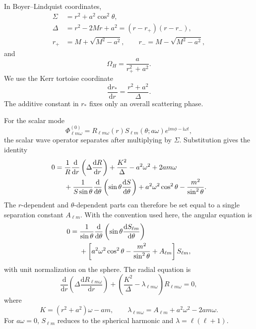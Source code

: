 \documentclass[aps,prd,twocolumn,nofootinbib,superscriptaddress,10pt,floatfix]{revtex4-2}
\newcommand{\ii}{\mathrm{i}}
\newcommand{\dd}{\mathrm{d}}
\newcommand{\rp}{r_+}
\newcommand{\rmn}{r_-}
\newcommand{\OmH}{\Omega_H}
\begin{document}
In Boyer--Lindquist coordinates,
\begin{align}
\Sigma &= r^2+a^2\cos^2\theta,\\
\Delta &= r^2-2Mr+a^2=(r-\rp)(r-\rmn),\\
\rp &= M+\sqrt{M^2-a^2},\qquad
\rmn = M-\sqrt{M^2-a^2},
\end{align}
and
\begin{equation}
\OmH=\frac{a}{\rp^2+a^2}.
\end{equation}
We use the Kerr tortoise coordinate
\begin{equation}
\frac{\dd r_*}{\dd r}=\frac{r^2+a^2}{\Delta}.
\end{equation}
The additive constant in $r_*$ fixes only an overall scattering phase.

For the scalar mode
\begin{equation}
\Phi_{\ell m\omega}^{(0)}
 =
R_{\ell m\omega}(r)S_{\ell m}(\theta;a\omega)
e^{\ii m\phi-\ii\omega t},
\end{equation}
the scalar wave operator separates after multiplying by $\Sigma$.  Substitution
gives the identity
\begin{align}
0={}&
\frac{1}{R}\frac{\dd}{\dd r}\left(\Delta\frac{\dd R}{\dd r}\right)
+\frac{K^2}{\Delta}
-a^2\omega^2+2am\omega
\notag\\
&+
\frac{1}{S\sin\theta}
\frac{\dd}{\dd\theta}\left(\sin\theta\frac{\dd S}{\dd\theta}\right)
+a^2\omega^2\cos^2\theta
-\frac{m^2}{\sin^2\theta}.
\label{eq:separatedidentity}
\end{align}
The $r$-dependent and $\theta$-dependent parts can therefore be set equal to a
single separation constant $A_{\ell m}$.  With the convention used here,
the angular equation is
\begin{align}
0={}&
\frac{1}{\sin\theta}\frac{\dd}{\dd\theta}
\left(\sin\theta\frac{\dd S_{\ell m}}{\dd\theta}\right)
\notag\\
&+
\left[
a^2\omega^2\cos^2\theta
-\frac{m^2}{\sin^2\theta}
+A_{\ell m}
\right]S_{\ell m},
\end{align}
with unit normalization on the sphere.  The radial equation is
\begin{equation}
\frac{\dd}{\dd r}
\left(\Delta\frac{\dd R_{\ell m\omega}}{\dd r}\right)
+
\left(\frac{K^2}{\Delta}-\lambda_{\ell m\omega}\right)
R_{\ell m\omega}=0,
\label{eq:radial}
\end{equation}
where
\begin{equation}
K=(r^2+a^2)\omega-am,\qquad
\lambda_{\ell m\omega}=A_{\ell m}+a^2\omega^2-2am\omega .
\end{equation}
For $a\omega=0$, $S_{\ell m}$ reduces to the spherical harmonic and
$\lambda=\ell(\ell+1)$.
\end{document}

